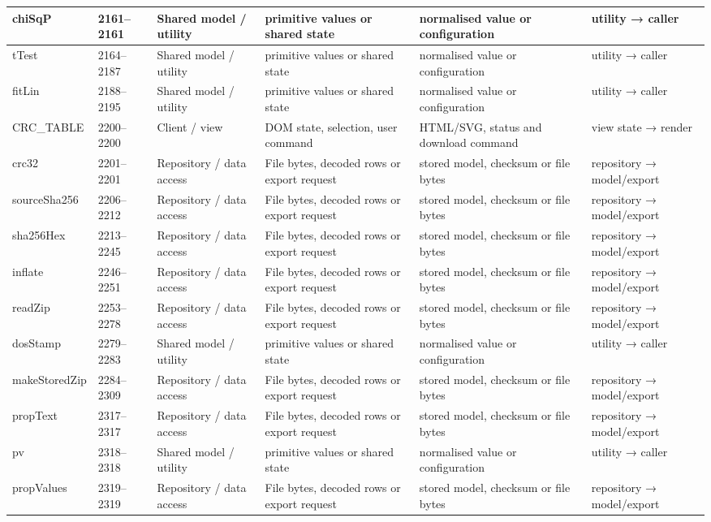 \begin{landscape}
\begin{longtable}{@{}p{3.2cm}p{1.45cm}p{2.7cm}p{4.0cm}p{4.0cm}p{3.0cm}@{}}
chiSqP & 2161--2161 & Shared model / utility & primitive values or shared state & normalised value or configuration & utility → caller \\\hline
tTest & 2164--2187 & Shared model / utility & primitive values or shared state & normalised value or configuration & utility → caller \\\hline
fitLin & 2188--2195 & Shared model / utility & primitive values or shared state & normalised value or configuration & utility → caller \\\hline
CRC\_TABLE & 2200--2200 & Client / view & DOM state, selection, user command & HTML/SVG, status and download command & view state → render \\\hline
crc32 & 2201--2201 & Repository / data access & File bytes, decoded rows or export request & stored model, checksum or file bytes & repository → model/export \\\hline
sourceSha256 & 2206--2212 & Repository / data access & File bytes, decoded rows or export request & stored model, checksum or file bytes & repository → model/export \\\hline
sha256Hex & 2213--2245 & Repository / data access & File bytes, decoded rows or export request & stored model, checksum or file bytes & repository → model/export \\\hline
inflate & 2246--2251 & Repository / data access & File bytes, decoded rows or export request & stored model, checksum or file bytes & repository → model/export \\\hline
readZip & 2253--2278 & Repository / data access & File bytes, decoded rows or export request & stored model, checksum or file bytes & repository → model/export \\\hline
dosStamp & 2279--2283 & Shared model / utility & primitive values or shared state & normalised value or configuration & utility → caller \\\hline
makeStoredZip & 2284--2309 & Repository / data access & File bytes, decoded rows or export request & stored model, checksum or file bytes & repository → model/export \\\hline
propText & 2317--2317 & Repository / data access & File bytes, decoded rows or export request & stored model, checksum or file bytes & repository → model/export \\\hline
pv & 2318--2318 & Shared model / utility & primitive values or shared state & normalised value or configuration & utility → caller \\\hline
propValues & 2319--2319 & Repository / data access & File bytes, decoded rows or export request & stored model, checksum or file bytes & repository → model/export \\\hline

\end{longtable}
\end{landscape}
